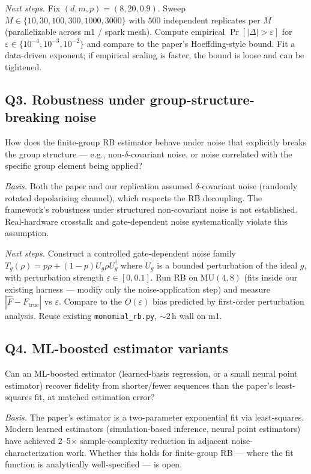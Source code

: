 \emph{Next steps.} Fix $(d, m, p) = (8, 20, 0.9)$. Sweep $M \in \{10, 30, 100, 300, 1000, 3000\}$ with $500$ independent replicates per $M$ (parallelizable across m1 / spark mesh). Compute empirical $\Pr[|\Delta| > \varepsilon]$ for $\varepsilon \in \{10^{-4}, 10^{-3}, 10^{-2}\}$ and compare to the paper's Hoeffding-style bound. Fit a data-driven exponent; if empirical scaling is faster, the bound is loose and can be tightened.

\subsection*{Q3. Robustness under group-structure-breaking noise}
How does the finite-group RB estimator behave under noise that explicitly breaks the group structure --- e.g., non-$\delta$-covariant noise, or noise correlated with the specific group element being applied?

\emph{Basis.} Both the paper and our replication assumed $\delta$-covariant noise (randomly rotated depolarising channel), which respects the RB decoupling. The framework's robustness under structured non-covariant noise is not established. Real-hardware crosstalk and gate-dependent noise systematically violate this assumption.

\emph{Next steps.} Construct a controlled gate-dependent noise family $T_g(\rho) = p\rho + (1-p) U_g \rho U_g^\dagger$ where $U_g$ is a bounded perturbation of the ideal $g$, with perturbation strength $\varepsilon \in [0, 0.1]$. Run RB on $\mathrm{MU}(4,8)$ (fits inside our existing harness --- modify only the noise-application step) and measure $|\hat F - F_{\text{true}}|$ vs $\varepsilon$. Compare to the $O(\varepsilon)$ bias predicted by first-order perturbation analysis. Reuse existing \texttt{monomial\_rb.py}, $\sim 2$\,h wall on m1.

\subsection*{Q4. ML-boosted estimator variants}
Can an ML-boosted estimator (learned-basis regression, or a small neural point estimator) recover fidelity from shorter/fewer sequences than the paper's least-squares fit, at matched estimation error?

\emph{Basis.} The paper's estimator is a two-parameter exponential fit via least-squares. Modern learned estimators (simulation-based inference, neural point estimators) have achieved 2--5$\times$ sample-complexity reduction in adjacent noise-characterization work. Whether this holds for finite-group RB --- where the fit function is analytically well-specified --- is open.

